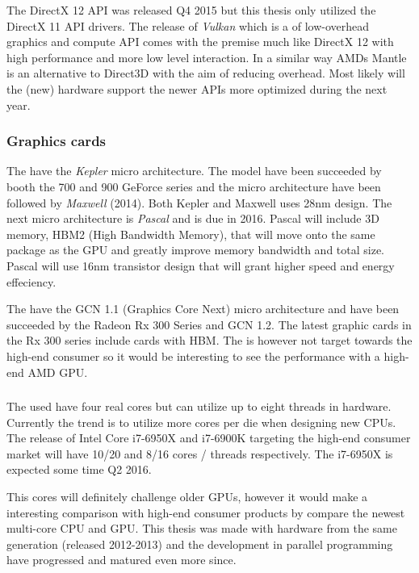 The DirectX 12 API was released Q4 2015 but this thesis only utilized the DirectX 11 API drivers. The release of \textit{Vulkan} which is a of low-overhead graphics and compute API comes with the premise much like DirectX 12 with high performance and more low level interaction. In a similar way AMDs Mantle is an alternative to Direct3D with the aim of reducing overhead. Most likely will the (new) hardware support the newer APIs more optimized during the next year.

\subsubsection{Graphics cards}

The {\NVCARD} have the \textit{Kepler} micro architecture. The model have been succeeded by booth the 700 and 900 GeForce series and the micro architecture have been followed by \textit{Maxwell} (2014). Both Kepler and Maxwell uses 28nm design. The next micro architecture is \textit{Pascal} and is due in 2016. Pascal will include 3D memory, HBM2 (High Bandwidth Memory), that will move onto the same package as the GPU and greatly improve memory bandwidth and total size. Pascal will use 16nm transistor design that will grant higher speed and energy effeciency.

The {\AMDCARD} have the GCN 1.1 (Graphics Core Next) micro architecture and have been succeeded by the Radeon Rx 300 Series and GCN 1.2. The latest graphic cards in the Rx 300 series include cards with HBM. The {\AMDCARD} is however not target towards the high-end consumer so it would be interesting to see the performance with a high-end AMD GPU.

\subsubsection{\INTELCPU}

The used {\INTELCPU} have four real cores but can utilize up to eight threads in hardware. Currently the trend is to utilize more cores per die when designing new CPUs. The release of Intel Core i7-6950X and i7-6900K targeting the high-end consumer market will have 10/20 and 8/16 cores / threads respectively. The i7-6950X is expected some time Q2 2016.

This cores will definitely challenge older GPUs, however it would make a interesting comparison with high-end consumer products by compare the newest multi-core CPU and GPU. This thesis was made with hardware from the same generation (released 2012-2013) and the development in parallel programming have progressed and matured even more since.